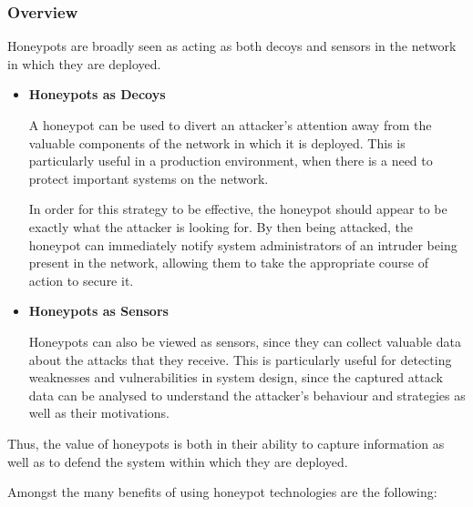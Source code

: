 
\subsubsection{Overview}

Honeypots are broadly seen as acting as both decoys and sensors in the network in which they are deployed.

\begin{itemize}
\item \textbf{Honeypots as Decoys}

A honeypot can be used to divert an attacker's attention away from the valuable components of the network in which it is deployed. This is particularly useful in a production environment, when there is a need to protect important systems on the network. 

In order for this strategy to be effective, the honeypot should appear to be exactly what the attacker is looking for. By then being attacked, the honeypot can immediately notify system administrators of an intruder being present in the network, allowing them to take the appropriate course of action to secure it.

\item \textbf{Honeypots as Sensors}

Honeypots can also be viewed as sensors, since they can collect valuable data about the attacks that they receive. This is particularly useful for detecting weaknesses and vulnerabilities in system design, since the captured attack data can be analysed to understand the attacker's behaviour and strategies as well as their motivations.
\end{itemize}

Thus, the value of honeypots is both in their ability to capture information as well as to defend the system within which they are deployed.

Amongst the many benefits of using honeypot technologies are the following:

